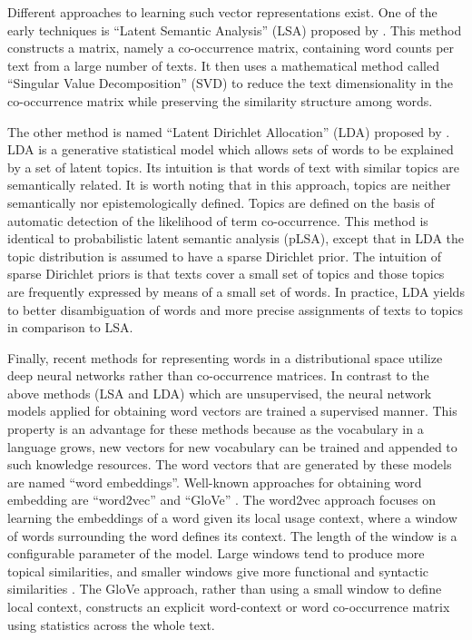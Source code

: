 Different approaches to learning such vector representations exist.  
One of the early techniques is ``Latent Semantic Analysis'' (LSA) proposed by . 
This method constructs a matrix, namely a co-occurrence matrix, containing word counts per text from a large number of texts.   
It then uses a mathematical method called ``Singular Value Decomposition'' (SVD) \cite{furnas88} to reduce the text dimensionality in the co-occurrence matrix while preserving the similarity structure among words. 

The other method is named ``Latent Dirichlet Allocation'' (LDA) proposed by . 
LDA is a generative statistical model which allows sets of words to be explained by a set of latent topics.  
Its intuition is that words of text with similar topics are semantically related. 
It is worth noting that in this approach, topics are neither semantically nor epistemologically defined. 
Topics are defined on the basis of automatic detection of the likelihood of term co-occurrence. 
This method is identical to probabilistic latent semantic analysis (pLSA), except that in LDA the topic distribution is assumed to have a sparse Dirichlet prior.
The intuition of sparse Dirichlet priors is that texts cover a small set of topics and those topics are frequently expressed by means of a small set of words. 
In practice, LDA yields to better disambiguation of words and more precise assignments of texts to topics in comparison to LSA. 

Finally, recent methods for representing words in a distributional space utilize deep neural networks rather than co-occurrence matrices. 
In contrast to the above methods (LSA and LDA) which are unsupervised, the neural network models applied for obtaining word vectors are trained a supervised manner.  This property is an advantage for these methods because as the vocabulary in a language grows, new vectors for new vocabulary can be trained and appended to such knowledge resources.  
The word vectors that are generated by these models are named ``word embeddings''. 
Well-known approaches for obtaining word embedding are ``word2vec''  \cite{mikolov13} and ``GloVe'' \cite{pennington14}. 
The word2vec approach focuses on learning the embeddings of a word given its local usage context, where a window of words surrounding the word defines its context. 
The length of the window is a configurable parameter of the model. 
Large windows tend to produce more topical similarities, and smaller windows give more functional and syntactic similarities \cite{goldberg17}. 
The GloVe approach, rather than using a small window to define local context,  constructs an explicit word-context or word co-occurrence matrix using statistics across the whole text. 

